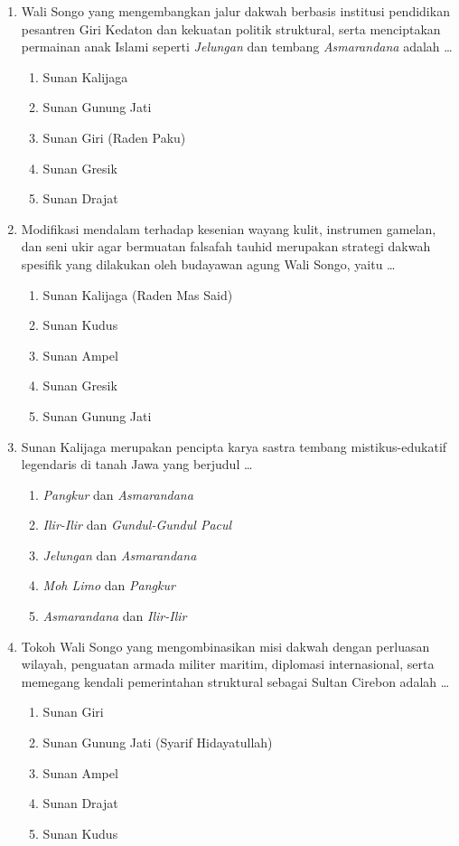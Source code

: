 \documentclass[12pt,a4paper]{article}
\begin{document}
\begin{enumerate}[leftmargin=*]
\item Wali Songo yang mengembangkan jalur dakwah berbasis institusi pendidikan pesantren Giri Kedaton dan kekuatan politik struktural, serta menciptakan permainan anak Islami seperti \textit{Jelungan} dan tembang \textit{Asmarandana} adalah \dots
    \begin{enumerate}[label=\alph*.]
        \item Sunan Kalijaga
        \item Sunan Gunung Jati
        \item Sunan Giri (Raden Paku)
        \item Sunan Gresik
        \item Sunan Drajat
    \end{enumerate}

\item Modifikasi mendalam terhadap kesenian wayang kulit, instrumen gamelan, dan seni ukir agar bermuatan falsafah tauhid merupakan strategi dakwah spesifik yang dilakukan oleh budayawan agung Wali Songo, yaitu \dots
    \begin{enumerate}[label=\alph*.]
        \item Sunan Kalijaga (Raden Mas Said)
        \item Sunan Kudus
        \item Sunan Ampel
        \item Sunan Gresik
        \item Sunan Gunung Jati
    \end{enumerate}

\item Sunan Kalijaga merupakan pencipta karya sastra tembang mistikus-edukatif legendaris di tanah Jawa yang berjudul \dots
    \begin{enumerate}[label=\alph*.]
        \item \textit{Pangkur} dan \textit{Asmarandana}
        \item \textit{Ilir-Ilir} dan \textit{Gundul-Gundul Pacul}
        \item \textit{Jelungan} dan \textit{Asmarandana}
        \item \textit{Moh Limo} dan \textit{Pangkur}
        \item \textit{Asmarandana} dan \textit{Ilir-Ilir}
    \end{enumerate}

\item Tokoh Wali Songo yang mengombinasikan misi dakwah dengan perluasan wilayah, penguatan armada militer maritim, diplomasi internasional, serta memegang kendali pemerintahan struktural sebagai Sultan Cirebon adalah \dots
    \begin{enumerate}[label=\alph*.]
        \item Sunan Giri
        \item Sunan Gunung Jati (Syarif Hidayatullah)
        \item Sunan Ampel
        \item Sunan Drajat
        \item Sunan Kudus
    \end{enumerate}


\end{enumerate}
\end{document}
